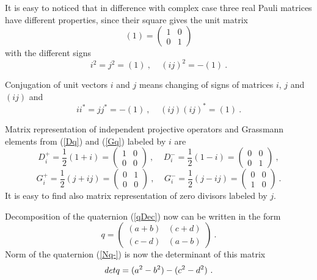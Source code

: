 \documentclass[a4paper,12pt]{article}
\begin{document}
It is easy to noticed that in difference with complex case three real Pauli matrices 
have different properties, since their square gives the unit matrix 
\[ (1) = \left( \begin{array}{cc} 1 & 0 \\  
                                  0 & 1   
      \end{array} \right) \]
with the different signs
\begin{equation} \label{square}
i^2 = j^2 = (1) ~, ~~~~~(ij)^2 = -(1) ~.
\end{equation}

Conjugation of unit vectors $i$ and $j$ means changing of signs of matrices $i$, $j$ 
and $(ij)$ and
\begin{equation} \label{i-norm}
ii^* = jj^* = -(1) ~, ~~~~~(ij)(ij)^* = (1) ~.
\end{equation}

Matrix representation of independent projective operators and Grassmann elements from 
(\ref{Dq}) and (\ref{Gq}) labeled by $i$ are
\[ D^+_i = \frac{1}{2}(1+i) = \left( \begin{array}{cc} 1 & 0 \\  
                                               0 & 0   
      \end{array} \right) ~, 
 ~~~~~
D^-_i =\frac{1}{2}(1-i)  = \left( \begin{array}{cc} 0 & 0 \\  
                                             0 & 1   
            \end{array} \right) ~, \]
\[  G^+_i =\frac{1}{2}(j+ij) = \left( \begin{array}{cc} 0 & 1 \\  
                                               0 & 0   
      \end{array} \right) ~, ~~~~~
G^-_i =\frac{1}{2}(j-ij)  = \left( \begin{array}{cc} 0 & 0 \\  
                                              1 & 0   
            \end{array} \right) ~. \]
It is easy to find also matrix representation of zero divisors labeled by $j$.

Decomposition of the quaternion (\ref{qDec}) now can be written in the form
\[ q = 
 \left( \begin{array}{cc} (a+b) & (c+d) \\  
                          (c-d) & (a-b)    
      \end{array} \right)  ~.\]
Norm of the quaternion (\ref{Nq-}) is now the determinant of this matrix 
\begin{equation} \label{q-norm}
{\it det} q = (a^2 - b^2) - (c^2 - d^2) ~.
\end{equation}
\end{document}
